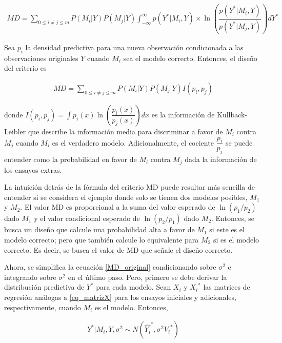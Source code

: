 \begin{equation*}
	\begin{aligned}
		MD = \sum_{0 \leq i \neq j \leq m} P(M_i | Y) P(M_j | Y) \int_{-\infty}^{\infty} p(Y^{*} | M_i, Y) \times \ln(\dfrac{p(Y^{*} | M_i, Y)}{p(Y^{*} | M_j, Y)}) dY^{*}
	\end{aligned}
\end{equation*}

Sea $p_i$ la densidad predictiva para una nueva observación condicionada a las observaciones originales $Y$ cuando $M_i$ sea el modelo correcto. Entonces, el diseño del criterio es 

\begin{equation} \label{MD_original}
	\begin{aligned}
		MD = \sum_{0 \leq i \neq j \leq m} P(M_i | Y)  P(M_j | Y) I(p_i, p_j)
	\end{aligned}
\end{equation}

\noindent donde $I(p_i, p_j) = \int p_i(x) \ln(\dfrac{p_i(x)}{p_j(x)}) dx$ es la información de Kullback-Leibler que describe la información media para discriminar a favor de $M_i$ contra $M_j$ cuando $M_i$ es el verdadero modelo. Adicionalmente, el cociente $\dfrac{p_i}{p_j}$ se puede entender como la probabilidad en favor de $M_i$ contra $M_j$ dada la información de los ensayos extras. 

La intuición detrás de la fórmula del criterio MD puede resultar más sencilla de entender si se considera el ejemplo donde solo se tienen dos modelos posibles, $M_1$ y $M_2$. El valor MD es proporcional a la suma del valor esperado de $\ln(p_1/p_2)$ dado $M_1$ y el valor condicional esperado de  $\ln(p_2/p_1)$ dado $M_2$. Entonces, se busca un diseño que calcule una probabilidad alta a favor de $M_1$ si este es el modelo correcto; pero que también calcule lo equivalente para $M_2$ si es el modelo correcto. Es decir, se busca el valor de MD que señale el diseño correcto. 

Ahora, se simplifica la ecuación \ref{MD_original} condicionando sobre $\sigma^{2}$ e integrando sobre $\sigma^{2}$ en el último paso. Pero, primero se debe derivar la distribución predictiva de $Y^{*}$ para cada modelo. Sean ${X_i}$ y ${X_i}^{*}$ las matrices de regresión análogas a \ref{eq_matrizX} para los ensayos iniciales y adicionales, respectivamente, cuando $M_i$ es el modelo. Entonces, 

\begin{equation*}
	\begin{aligned}
		Y^{*} | M_i, Y, \sigma^{2} \sim N(\hat{{Y_i}}^{*}, \sigma^{2} {V_i}^{*})
	\end{aligned}
\end{equation*}


